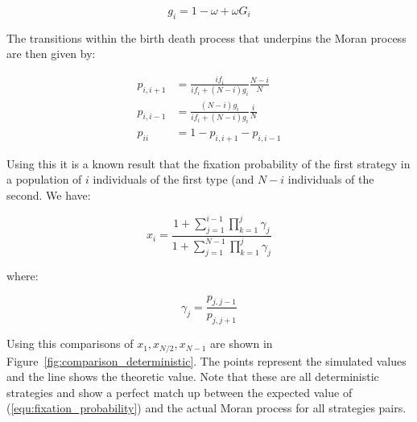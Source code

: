 \documentclass{article}
\begin{document}
\begin{equation}\label{equ:expected_payoff_two}
    g_i = 1 - \omega + \omega G_i
\end{equation}

The transitions within the birth death process that underpins the Moran process
are then given by:

\begin{align}
	p_{i, i+1}&= \frac{if_i}{if_i+(N-i)g_i}\frac{N-i}{N}\label{equ:p_up}\\
	p_{i, i-1}&= \frac{(N-i)g_i}{if_i+(N-i)g_i}\frac{i}{N}\label{equ:p_down}\\
	p_{ii} &= 1 - p_{i, i+1} - p_{i, i-1}\label{equ:p_stay}
\end{align}

Using this it is a known result that the fixation probability of the first
strategy in a population of \(i\) individuals of the first type (and \(N-i\)
individuals of the second. We have:

\begin{equation}\label{equ:fixation_probability}
x_i = \frac{1 + \sum_{j=1}^{i-1}\prod_{k=1}^{j}\gamma_j}{1 + \sum_{j=1}^{N-1}
      \prod_{k=1}^{j}\gamma_j}
\end{equation}

where:

\[
\gamma_j = \frac{p_{j, j-1}}{p_{j, j+1}}
\]

Using this comparisons of \(x_1, x_{N/2}, x_{N-1}\) are shown in
Figure~\ref{fig:comparison_deterministic}. The points represent the simulated
values and the line shows the theoretic value. Note that these are all
deterministic strategies and show a perfect match up between the expected value
of (\ref{equ:fixation_probability}) and the actual Moran process for all
strategies pairs.
\end{document}
